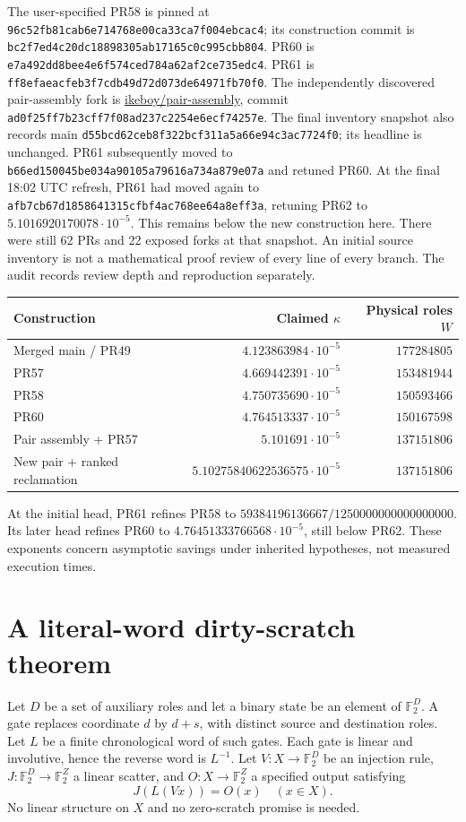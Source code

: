 \documentclass[11pt]{article}
\newcommand{\F}{\mathbb F_2}
\begin{document}
The user-specified PR58 is pinned at
\texttt{96c52fb81cab6e714768e00ca33ca7f004ebcac4}; its construction commit is
\texttt{bc2f7ed4c20dc18898305ab17165c0c995cbb804}.
PR60 is \texttt{e7a492dd8bee4e6f574ced784a62af2ce735edc4}.
PR61 is \texttt{ff8efaeacfeb3f7cdb49d72d073de64971fb70f0}.
The independently discovered pair-assembly fork is
\href{https://github.com/ikeboy/integer-mult-bounds/tree/ad0f25ff7b23cff7f08ad237c2254e6ecf74257e}{ikeboy/pair-assembly},
commit \texttt{ad0f25ff7b23cff7f08ad237c2254e6ecf74257e}.
The final inventory snapshot also records main
\texttt{d55bcd62ceb8f322bcf311a5a66e94c3ac7724f0}; its headline is unchanged.
PR61 subsequently moved to
\texttt{b66ed150045be034a90105a79616a734a879e07a} and retuned PR60.
At the final 18:02 UTC refresh, PR61 had moved again to
\texttt{afb7cb67d1858641315cfbf4ac768ee64a8eff3a}, retuning PR62 to
$5.1016920170078\cdot10^{-5}$. This remains below the new construction here.
There were still 62 PRs and 22 exposed forks at that snapshot.
An initial source inventory is not a mathematical proof review of every line
of every branch. The audit records review depth and reproduction separately.

\begin{center}
\begin{tabular}{lrr}
\toprule
Construction & Claimed $\kappa$ & Physical roles $W$\\
\midrule
Merged main / PR49 & $4.123863984\cdot10^{-5}$ & $177284805$\\
PR57 & $4.669442391\cdot10^{-5}$ & $153481944$\\
PR58 & $4.750735690\cdot10^{-5}$ & $150593466$\\
PR60 & $4.764513337\cdot10^{-5}$ & $150167598$\\
Pair assembly + PR57 & $5.101691\cdot10^{-5}$ & $137151806$\\
New pair + ranked reclamation & $5.10275840622536575\cdot10^{-5}$ & $137151806$\\
\bottomrule
\end{tabular}
\end{center}
At the initial head, PR61 refines PR58 to
$59384196136667/1250000000000000000$. Its later head refines PR60 to
$4.76451333766568\cdot10^{-5}$, still below PR62. These exponents concern asymptotic
savings under inherited hypotheses, not measured execution times.

\section{A literal-word dirty-scratch theorem}
Let $D$ be a set of auxiliary roles and let a binary state be an element of
$\F^D$. A gate replaces coordinate $d$ by $d+s$, with distinct source and
destination roles. Let $L$ be a finite chronological word of such gates.
Each gate is linear and involutive, hence the reverse word is $L^{-1}$.
Let $V:X\to\F^D$ be an injection rule, $J:\F^D\to\F^Z$ a linear
scatter, and $O:X\to\F^Z$ a specified output satisfying
\begin{equation}\label{eq:terminal} J(L(Vx))=O(x)\quad(x\in X).\end{equation}
No linear structure on $X$ and no zero-scratch promise is needed.
\end{document}
